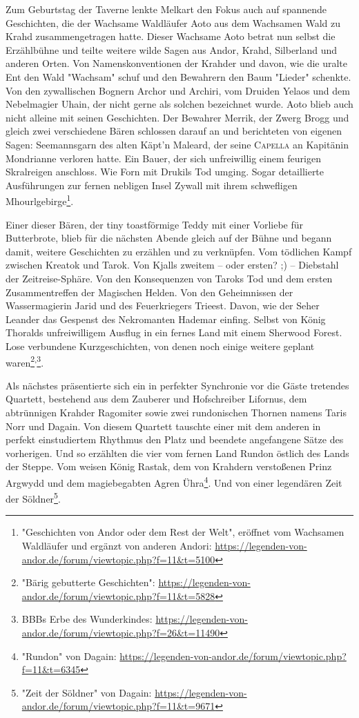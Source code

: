 Zum Geburtstag der Taverne lenkte Melkart den Fokus auch auf spannende Geschichten, die der Wachsame Waldläufer Aoto aus dem Wachsamen Wald zu Krahd zusammengetragen hatte. Dieser Wachsame Aoto betrat nun selbst die Erzählbühne und teilte weitere wilde Sagen aus Andor, Krahd, Silberland und anderen Orten. Von Namenskonventionen der Krahder und davon, wie die uralte Ent den Wald "Wachsam" schuf und den Bewahrern den Baum "Lieder" schenkte. Von den zywallischen Bognern Archor und Archiri, vom Druiden Yelaos und dem Nebelmagier Uhain, der nicht gerne als solchen bezeichnet wurde. Aoto blieb auch nicht alleine mit seinen Geschichten. Der Bewahrer Merrik, der Zwerg Brogg und gleich zwei verschiedene Bären schlossen darauf an und berichteten von eigenen Sagen: Seemannsgarn des alten Käpt'n Maleard, der seine \textsc{Capella} an Kapitänin Mondrianne verloren hatte. Ein Bauer, der sich unfreiwillig einem feurigen Skralreigen anschloss. Wie Forn mit Drukils Tod umging. Sogar detaillierte Ausführungen zur fernen nebligen Insel Zywall mit ihrem schwefligen Mhourlgebirge\footnote{"Geschichten von Andor oder dem Rest der Welt", eröffnet vom Wachsamen Waldläufer und ergänzt von anderen Andori: \url{https://legenden-von-andor.de/forum/viewtopic.php?f=11&t=5100}}.

Einer dieser Bären, der tiny toastförmige Teddy mit einer Vorliebe für Butterbrote, blieb für die nächsten Abende gleich auf der Bühne und begann damit, weitere Geschichten zu erzählen und zu verknüpfen. Vom tödlichen Kampf zwischen Kreatok und Tarok. Von Kjalls zweitem -- oder ersten? ;) -- Diebstahl der Zeitreise-Sphäre. Von den Konsequenzen von Taroks Tod und dem ersten Zusammentreffen der Magischen Helden. Von den Geheimnissen der Wassermagierin Jarid und des Feuerkriegers Trieest. Davon, wie der Seher Leander das Gespenst des Nekromanten Hademar einfing. Selbst von König Thoralds unfreiwilligem Ausflug in ein fernes Land mit einem Sherwood Forest. Lose verbundene Kurzgeschichten, von denen noch einige weitere geplant waren\footnote{"Bärig gebutterte Geschichten": \url{https://legenden-von-andor.de/forum/viewtopic.php?f=11&t=5828}}\textsuperscript{,}\footnote{BBBs Erbe des Wunderkindes: \url{https://legenden-von-andor.de/forum/viewtopic.php?f=26&t=11490}}.

Als nächstes präsentierte sich ein in perfekter Synchronie vor die Gäste tretendes Quartett, bestehend aus dem Zauberer und Hofschreiber Lifornus, dem abtrünnigen Krahder Ragomiter sowie zwei rundonischen Thornen namens Taris Norr und Dagain. Von diesem Quartett tauschte einer mit dem anderen in perfekt einstudiertem Rhythmus den Platz und beendete angefangene Sätze des vorherigen. Und so erzählten die vier vom fernen Land Rundon östlich des Lands der Steppe. Vom weisen König Rastak, dem von Krahdern verstoßenen Prinz Argwydd und dem magiebegabten Agren Ühra\footnote{"Rundon" von Dagain: \url{https://legenden-von-andor.de/forum/viewtopic.php?f=11&t=6345}}. Und von einer legendären Zeit der Söldner\footnote{"Zeit der Söldner" von Dagain: \url{https://legenden-von-andor.de/forum/viewtopic.php?f=11&t=9671}}. 




